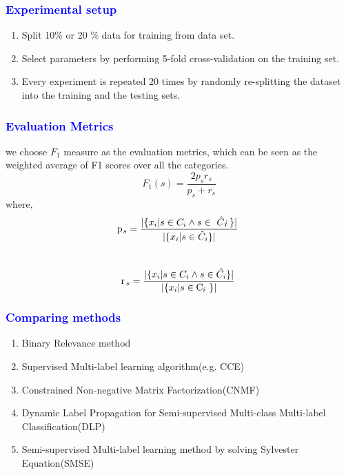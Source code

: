 \documentclass{beamer}
\newcommand{\tikzmark}[3][]{\tikz[overlay,remember picture,baseline] \node [anchor=base,#1](#2) {#3};}
\begin{document}
\begin{frame}
\frametitle{\textcolor{blue}{Experimental setup}}
\begin{enumerate}
\item Split 10\% or 20 \% data for training from data set.
\item Select parameters by performing 5-fold cross-validation on the training set.
\item Every experiment is repeated 20 times by randomly re-splitting the dataset into the training and the testing sets.

\end{enumerate}
\end{frame}

\begin{frame}
\frametitle{\textcolor{blue}{Evaluation Metrics}}
we choose $F_1$ measure as the evaluation metrics, which can be seen as the weighted average of F1 scores over all the categories.\\
\[
F_1(s) = \frac{2p_sr_s}{p_s + r_s}
\]
where, \\

\[
\tikzmark{pre}{p}\,\,_s = \frac{|\{x_i | s \in C_i \wedge s \in \,\,  \hat{C}\,_{\tikzmark{Chat}{$i$}} \,\, \}|}{|\{x_i | s \in \hat{C}_i\}|} 
\]
\\
\[
\tikzmark{rec}{r}\,\,_s = \frac{|\{x_i | s \in C_i \wedge s \in \hat{C_i}\}|}{|\{x_i | s \in  \,\, \tikzmark{C}{C} \,\,_i \,\, \}|}
\]



\end{frame}


\begin{frame}
\frametitle{\textcolor{blue}{Comparing methods}}

\begin{enumerate}
\item Binary Relevance method
\item Supervised Multi-label learning algorithm(e.g. CCE)
\item  Constrained Non-negative Matrix Factorization(CNMF)
\item Dynamic Label Propagation for Semi-supervised Multi-class Multi-label Classification(DLP)
\item Semi-supervised Multi-label learning method by solving Sylvester Equation(SMSE)
\end{enumerate}

\end{frame}
\end{document}
